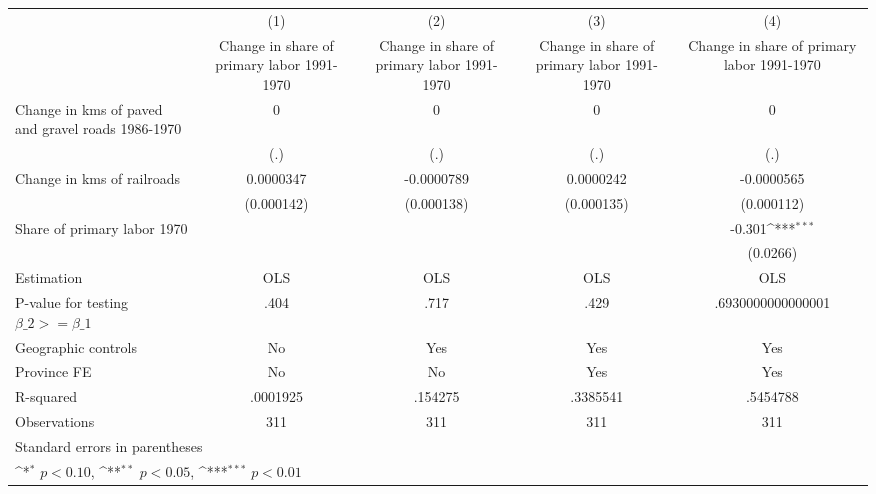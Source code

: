 {
\def\sym#1{\ifmmode^{#1}\else\(^{#1}\)\fi}
\begin{tabular}{l*{4}{c}}
\hline\hline
                    &\multicolumn{1}{c}{(1)}&\multicolumn{1}{c}{(2)}&\multicolumn{1}{c}{(3)}&\multicolumn{1}{c}{(4)}\\
                    &\multicolumn{1}{c}{Change in share of primary labor 1991-1970}&\multicolumn{1}{c}{Change in share of primary labor 1991-1970}&\multicolumn{1}{c}{Change in share of primary labor 1991-1970}&\multicolumn{1}{c}{Change in share of primary labor 1991-1970}\\
\hline
Change in kms of paved and gravel roads 1986-1970&           0         &           0         &           0         &           0         \\
                    &         (.)         &         (.)         &         (.)         &         (.)         \\
[1em]
Change in kms of railroads&   0.0000347         &  -0.0000789         &   0.0000242         &  -0.0000565         \\
                    &  (0.000142)         &  (0.000138)         &  (0.000135)         &  (0.000112)         \\
[1em]
Share of primary labor 1970&                     &                     &                     &      -0.301\sym{***}\\
                    &                     &                     &                     &    (0.0266)         \\
\hline
Estimation          &         OLS         &         OLS         &         OLS         &         OLS         \\
P-value for testing $\beta\_2 >= \beta\_1$&        .404         &        .717         &        .429         &.6930000000000001         \\
Geographic controls &          No         &         Yes         &         Yes         &         Yes         \\
Province FE         &          No         &          No         &         Yes         &         Yes         \\
R-squared           &    .0001925         &     .154275         &    .3385541         &    .5454788         \\
Observations        &         311         &         311         &         311         &         311         \\
\hline\hline
\multicolumn{5}{l}{\footnotesize Standard errors in parentheses}\\
\multicolumn{5}{l}{\footnotesize \sym{*} \(p<0.10\), \sym{**} \(p<0.05\), \sym{***} \(p<0.01\)}\\
\end{tabular}
}
